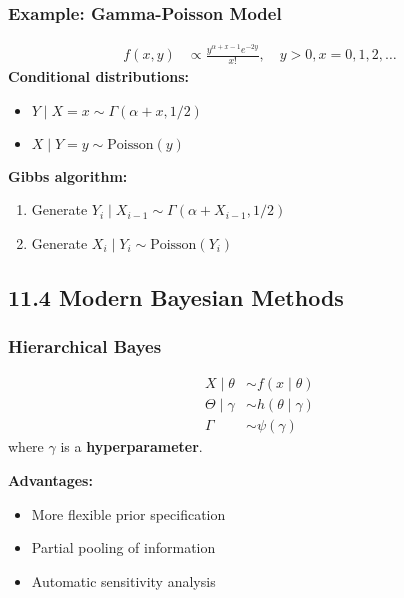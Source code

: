 \subsubsection{Example: Gamma-Poisson Model}
\[
\begin{aligned}
f(x,y) &\propto \frac{y^{\alpha+x-1} e^{-2y}}{x!}, \quad y > 0, x = 0,1,2,\ldots
\end{aligned}
\]
\textbf{Conditional distributions:}

\begin{itemize}
	\item $Y \mid X=x \sim \Gamma(\alpha + x, 1/2)$
	\item $X \mid Y=y \sim \text{Poisson}(y)$
\end{itemize}

\textbf{Gibbs algorithm:}

\begin{enumerate}
	\item Generate $Y_i \mid X_{i-1} \sim \Gamma(\alpha + X_{i-1}, 1/2)$
	\item Generate $X_i \mid Y_i \sim \text{Poisson}(Y_i)$
\end{enumerate}

\subsection{11.4 Modern Bayesian Methods}

\subsubsection{Hierarchical Bayes}

\begin{definition}
\[
\begin{aligned}
X \mid \theta &\sim f(x \mid \theta) \\
\Theta \mid \gamma &\sim h(\theta \mid \gamma) \\
\Gamma &\sim \psi(\gamma)
\end{aligned}
\]where $\gamma$ is a \textbf{hyperparameter}.
\end{definition}
\textbf{Advantages:}

\begin{itemize}
	\item More flexible prior specification
	\item Partial pooling of information
	\item Automatic sensitivity analysis
\end{itemize}

